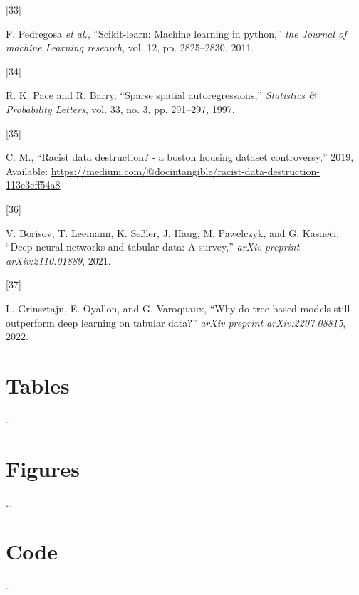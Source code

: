 \documentclass[
  conference]{IEEEtran}
\newlength{\cslhangindent}
\newlength{\csllabelwidth}
\newlength{\cslentryspacingunit} %
\newenvironment{CSLReferences}[2] %
 {%
  \setlength{\parindent}{0pt}
  \ifodd #1
  \let\oldpar\par
  \def\par{\hangindent=\cslhangindent\oldpar}
  \fi
  \setlength{\parskip}{#2\cslentryspacingunit}
 }%
 {}
\newcommand{\CSLLeftMargin}[1]{\parbox[t]{\csllabelwidth}{#1}}
\newcommand{\CSLRightInline}[1]{\parbox[t]{\linewidth - \csllabelwidth}{#1}\break}
\begin{document}
\begin{CSLReferences}{0}{0}
\leavevmode{}%
\CSLLeftMargin{{[}33{]} }%
\CSLRightInline{F. Pedregosa \emph{et al.}, {``Scikit-learn: Machine
learning in python,''} \emph{the Journal of machine Learning research},
vol. 12, pp. 2825--2830, 2011.}

\leavevmode{}%
\CSLLeftMargin{{[}34{]} }%
\CSLRightInline{R. K. Pace and R. Barry, {``Sparse spatial
autoregressions,''} \emph{Statistics \& Probability Letters}, vol. 33,
no. 3, pp. 291--297, 1997.}

\leavevmode{}%
\CSLLeftMargin{{[}35{]} }%
\CSLRightInline{C. M., {``Racist data destruction? - a boston housing
dataset controversy,''} 2019, Available:
\url{https://medium.com/@docintangible/racist-data-destruction-113e3eff54a8}}

\leavevmode{}%
\CSLLeftMargin{{[}36{]} }%
\CSLRightInline{V. Borisov, T. Leemann, K. Seßler, J. Haug, M.
Pawelczyk, and G. Kasneci, {``Deep neural networks and tabular data: A
survey,''} \emph{arXiv preprint arXiv:2110.01889}, 2021.}

\leavevmode{}%
\CSLLeftMargin{{[}37{]} }%
\CSLRightInline{L. Grinsztajn, E. Oyallon, and G. Varoquaux, {``Why do
tree-based models still outperform deep learning on tabular data?''}
\emph{arXiv preprint arXiv:2207.08815}, 2022.}

\end{CSLReferences}

\pagebreak

\hypertarget{tables}{%
\section{Tables}\label{tables}}

\ldots{}

\pagebreak

\hypertarget{figures}{%
\section{Figures}\label{figures}}

\ldots{}

\pagebreak

\hypertarget{code}{%
\section{Code}\label{code}}

\ldots{}
\end{document}

